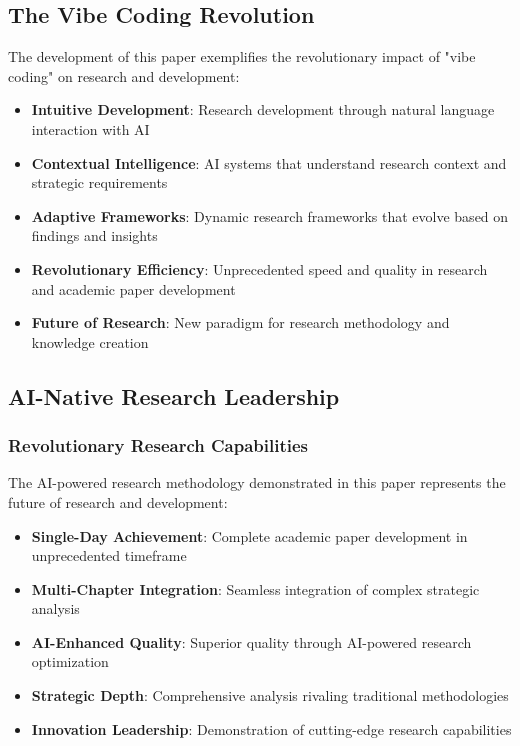 \documentclass[12pt,a4paper]{book}
\begin{document}
\subsection{The Vibe Coding Revolution}

The development of this paper exemplifies the revolutionary impact of "vibe coding" on research and development:

\begin{itemize}
    \item \textbf{Intuitive Development}: Research development through natural language interaction with AI
    \item \textbf{Contextual Intelligence}: AI systems that understand research context and strategic requirements
    \item \textbf{Adaptive Frameworks}: Dynamic research frameworks that evolve based on findings and insights
    \item \textbf{Revolutionary Efficiency}: Unprecedented speed and quality in research and academic paper development
    \item \textbf{Future of Research}: New paradigm for research methodology and knowledge creation
\end{itemize}

\subsection{AI-Native Research Leadership}

\subsubsection{Revolutionary Research Capabilities}

The AI-powered research methodology demonstrated in this paper represents the future of research and development:

\begin{itemize}
    \item \textbf{Single-Day Achievement}: Complete academic paper development in unprecedented timeframe
    \item \textbf{Multi-Chapter Integration}: Seamless integration of complex strategic analysis
    \item \textbf{AI-Enhanced Quality}: Superior quality through AI-powered research optimization
    \item \textbf{Strategic Depth}: Comprehensive analysis rivaling traditional methodologies
    \item \textbf{Innovation Leadership}: Demonstration of cutting-edge research capabilities
\end{itemize}
\end{document}
